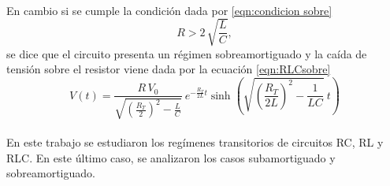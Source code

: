 \paragraph{}
En cambio si se cumple la condición dada por \eqref{eqn:condicion sobre}
\begin{equation}\label{eqn:condicion sobre}
    R > 2\,\sqrt{\frac{L}{C}},
\end{equation}
se dice que el circuito presenta un régimen sobreamortiguado y la caída de tensión sobre el resistor viene dada por la ecuación \eqref{eqn:RLCsobre}
\begin{equation}\label{eqn:RLCsobre}
    V(t)=\frac{R \, V_0}{\sqrt{\left( \frac{R_{T}}{2}\right)^2-\frac{L}{C}}} \ e^{ -\frac{R_{T}}{2L}t} \sinh \left(\sqrt{\left(\frac{R_{T}}{2L}\right)^2-\frac{1}{LC}}\ t\right)
\end{equation}
\paragraph{}
En este trabajo se estudiaron los regímenes transitorios de circuitos RC, RL y RLC. En este último caso, se analizaron los casos subamortiguado y sobreamortiguado.